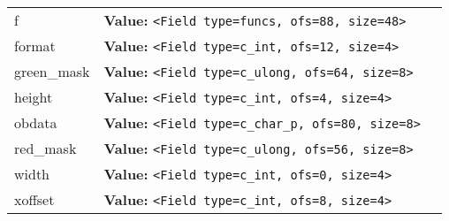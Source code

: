 \begin{longtable}{|p{\varnamewidth}|p{\vardescrwidth}|l}
\cline{1-2}
\raggedright f\- & \raggedright \textbf{Value:} 
{\tt {\textless}Field type=funcs, ofs=88, size=48{\textgreater}}&\\
\cline{1-2}
\raggedright f\-o\-r\-m\-a\-t\- & \raggedright \textbf{Value:} 
{\tt {\textless}Field type=c\_int, ofs=12, size=4{\textgreater}}&\\
\cline{1-2}
\raggedright g\-r\-e\-e\-n\-\_\-m\-a\-s\-k\- & \raggedright \textbf{Value:} 
{\tt {\textless}Field type=c\_ulong, ofs=64, size=8{\textgreater}}&\\
\cline{1-2}
\raggedright h\-e\-i\-g\-h\-t\- & \raggedright \textbf{Value:} 
{\tt {\textless}Field type=c\_int, ofs=4, size=4{\textgreater}}&\\
\cline{1-2}
\raggedright o\-b\-d\-a\-t\-a\- & \raggedright \textbf{Value:} 
{\tt {\textless}Field type=c\_char\_p, ofs=80, size=8{\textgreater}}&\\
\cline{1-2}
\raggedright r\-e\-d\-\_\-m\-a\-s\-k\- & \raggedright \textbf{Value:} 
{\tt {\textless}Field type=c\_ulong, ofs=56, size=8{\textgreater}}&\\
\cline{1-2}
\raggedright w\-i\-d\-t\-h\- & \raggedright \textbf{Value:} 
{\tt {\textless}Field type=c\_int, ofs=0, size=4{\textgreater}}&\\
\cline{1-2}
\raggedright x\-o\-f\-f\-s\-e\-t\- & \raggedright \textbf{Value:} 
{\tt {\textless}Field type=c\_int, ofs=8, size=4{\textgreater}}&\\
\cline{1-2}
\end{longtable}

